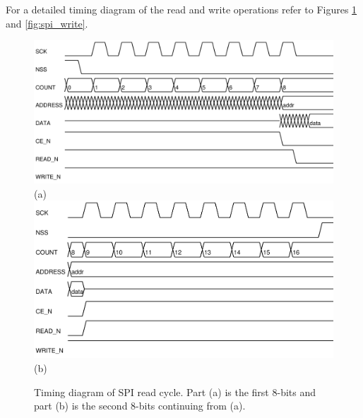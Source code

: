 \documentclass{article}
\begin{document}
For a detailed timing diagram of the read and write operations refer
to Figures \ref{fig:spi_read} and \ref{fig:spi_write}.

\begin{figure}
\center
\includegraphics[scale=0.7]{figures/spi_ctl-timing/read-byte1} \\
(a) \\
\includegraphics[scale=0.7]{figures/spi_ctl-timing/read-byte2} \\
(b)
\caption{Timing diagram of SPI read cycle.
Part (a) is the first 8-bits and part (b) is the second
8-bits continuing from (a).}
\label{fig:spi_read}
\end{figure}
\end{document}
